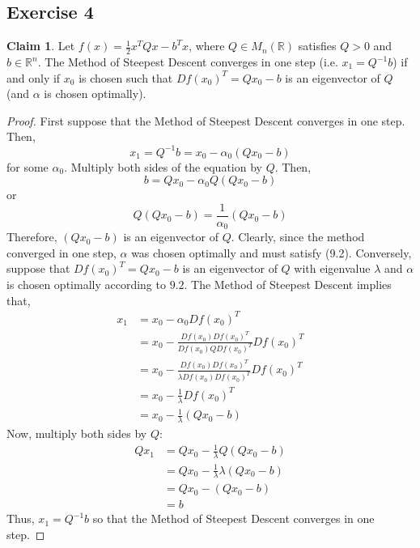 \documentclass[letterpaper,12pt]{article}
\theoremstyle{definition}
\newtheorem{claim}[theorem]{Claim}
\begin{document}
\subsection*{Exercise 4}
\begin{claim}
Let $f(x) = \frac{1}{2}x^TQx - b^Tx$, where $Q \in M_n( \mathbb{R})$ satisfies $Q > 0 $ and $b \in \mathbb{R}^n$. The Method of Steepest Descent converges in one step (i.e. $x_1 = Q^{-1}b$) if and only if $x_0$ is chosen such that $Df(x_0)^T = Qx_0 - b$ is an eigenvector of $Q$ (and $\alpha$ is chosen optimally). 
\end{claim}
\begin{proof}
First suppose that the Method of Steepest Descent converges in one step. Then, 
\begin{equation}
x_1 = Q^{-1}b = x_0 - \alpha_0 (Qx_0 - b)
\end{equation}
for some $\alpha_0$. Multiply both sides of the equation by $Q$. Then, 
\begin{equation}
b = Qx_0 - \alpha_0 Q(Qx_0 - b)
\end{equation}
or 
\begin{equation}
Q(Qx_0 - b) = \frac{1}{\alpha_0} (Qx_0 - b)
\end{equation}
Therefore, $(Qx_0 - b)$ is an eigenvector of $Q$. Clearly, since the method converged in one step, $\alpha$ was chosen optimally and must satisfy (9.2). Conversely, suppose that  $Df(x_0)^T = Qx_0 - b$ is an eigenvector of $Q$ with eigenvalue $\lambda$ and $\alpha$ is chosen optimally according to $9.2$. The Method of Steepest Descent implies that,
\begin{align*}
x_1 &= x_0 - \alpha_0 Df(x_0)^T \\
&= x_0 - \frac{Df(x_0)Df(x_0)^T}{Df(x_0)QDf(x_0)^T} Df(x_0)^T \\
&= x_0 - \frac{Df(x_0)Df(x_0)^T}{ \lambda Df(x_0)Df(x_0)^T} Df(x_0)^T\\
&= x_0 - \frac{1}{\lambda} Df(x_0)^T \\
&= x_0 - \frac{1}{\lambda} (Qx_0 - b)
\end{align*}
Now, multiply both sides by $Q$:
\begin{align*}
Qx_1 &= Qx_0 - \frac{1}{\lambda} Q(Qx_0 - b) \\
&= Qx_0 - \frac{1}{\lambda} \lambda (Qx_0 - b) \\
&= Qx_0 - (Qx_0 - b) \\
&= b
\end{align*}
Thus, $x_1 = Q^{-1}b$ so that the Method of Steepest Descent converges in one step.
\end{proof}
\end{document}
